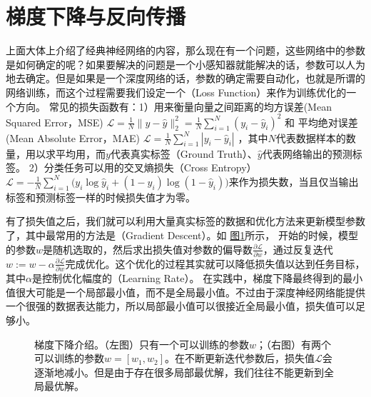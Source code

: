 \documentclass[letterpaper,10pt,english]{sphinxmanual}
\let\sphinxpxdimen\pdfpxdimen\else\newdimen\sphinxpxdimen
\begin{document}
\section{梯度下降与反向传播}
\label{\detokenize{appendix_machine_learning_introduction/gradient_descent:id1}}\label{\detokenize{appendix_machine_learning_introduction/gradient_descent::doc}}
\sphinxAtStartPar
上面大体上介绍了经典神经网络的内容，那么现在有一个问题，这些网络中的参数是如何确定的呢？如果要解决的问题是一个小感知器就能解决的话，参数可以人为地去确定。但是如果是一个深度网络的话，参数的确定需要自动化，也就是所谓的网络训练，而这个过程需要我们设定一个（Loss
Function）来作为训练优化的一个方向。
常见的损失函数有：1）用来衡量向量之间距离的均方误差(Mean Squared
Error，MSE)
\(\mathcal{L} = \frac{1}{N}\|{y}-\hat{{y}}\|^{2}_{2} = \frac{1}{N}\sum_{i=1}^N(y_{i}-\hat{y}_{i})^{2}\)
和 平均绝对误差(Mean Absolute Error，MAE)
\(\mathcal{L} = \frac{1}{N}\sum_{i=1}^{N}|y_{i}-\hat{y}_{i}|\)
，其中\(N\)代表数据样本的数量，用以求平均用，而\(y\)代表真实标签（Ground
Truth）、\(\hat{y}\)代表网络输出的预测标签。
2）分类任务可以用的交叉熵损失（Cross Entropy）
\(\mathcal{L} = - \frac{1}{N} \sum_{i=1}^N \bigg(y_{i}\log\hat{y}_{i} + (1 - y_{i})\log(1 - \hat{y}_{i})\bigg)\)来作为损失数，当且仅当输出标签和预测标签一样的时候损失值才为零。

\sphinxAtStartPar
有了损失值之后，我们就可以利用大量真实标签的数据和优化方法来更新模型参数了，其中最常用的方法是（Gradient
Descent）。如 \hyperref[\detokenize{appendix_machine_learning_introduction/gradient_descent:gradient-descent2}]{图\ref{\detokenize{appendix_machine_learning_introduction/gradient_descent:gradient-descent2}}}所示，
开始的时候，模型的参数\({w}\)是随机选取的，然后求出损失值对参数的偏导数\(\frac{\partial \mathcal{L}}{\partial {w}}\)，通过反复迭代
\({w}:={w}-\alpha\frac{\partial \mathcal{L}}{\partial {w}}\)完成优化。这个优化的过程其实就可以降低损失值以达到任务目标，其中\(\alpha\)是控制优化幅度的（Learning
Rate）。
在实践中，梯度下降最终得到的最小值很大可能是一个局部最小值，而不是全局最小值。不过由于深度神经网络能提供一个很强的数据表达能力，所以局部最小值可以很接近全局最小值，损失值可以足够小。

\begin{figure}[H]
\centering
\capstart

\noindent\sphinxincludegraphics[width=600\sphinxpxdimen]{{gradient_descent2}.png}
\caption{梯度下降介绍。（左图）只有一个可以训练的参数\(w\)；（右图）有两个可以训练的参数\({w}=[w_1,w_2]\)。在不断更新迭代参数后，损失值\(\mathcal{L}\)会逐渐地减小。但是由于存在很多局部最优解，我们往往不能更新到全局最优解。}\label{\detokenize{appendix_machine_learning_introduction/gradient_descent:id7}}\label{\detokenize{appendix_machine_learning_introduction/gradient_descent:gradient-descent2}}\end{figure}
\end{document}
